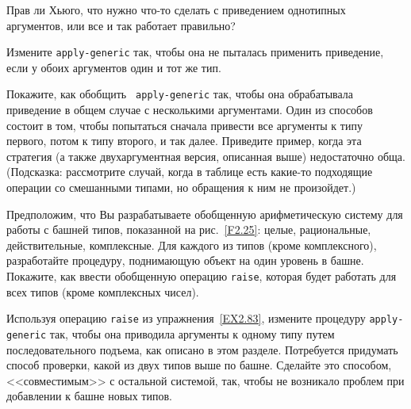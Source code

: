 \begin{exercise}{2.81}
\begin{plainenum}
\item
 Прав ли Хьюго, что нужно что-то сделать с
приведением однотипных аргументов, или все и так работает правильно?

\item
 Измените {\tt apply-generic} так,
чтобы она не пыталась применить приведение, если у обоих аргументов
один и тот же тип.
\end{plainenum}
\end{exercise}

\begin{exercise}{2.82}\label{EX2.82}%
Покажите, как обобщить {\tt
  apply-generic} так, 
чтобы она обрабатывала приведение в общем случае с несколькими
аргументами.  Один из способов состоит в том, чтобы попытаться сначала
привести все аргументы к типу первого, потом к типу второго, и так
далее.  Приведите пример, когда эта стратегия (а также двухаргументная
версия, описанная выше) недостаточно обща.  (Подсказка: рассмотрите
случай, когда в таблице есть какие-то подходящие операции со
смешанными типами, но обращения к ним не произойдет.)
\end{exercise}

\begin{exercise}{2.83}\label{EX2.83}%
Предположим, что Вы разрабатываете обобщенную
арифметическую систему для работы с башней типов, показанной на
рис.~\ref{F2.25}: целые, рациональные, действительные,
комплексные.   Для каждого из типов (кроме комплексного), разработайте
процедуру, поднимающую объект на один уровень в башне.  Покажите, как
ввести обобщенную операцию {\tt raise}, которая будет
работать для всех типов (кроме комплексных чисел).
\end{exercise}

\begin{exercise}{2.84}\label{EX2.84}%
Используя операцию {\tt raise} из
упражнения~\ref{EX2.83}, измените процедуру
{\tt apply-generic} так, чтобы она приводила аргументы к одному
типу путем последовательного подъема, как описано в этом разделе.
Потребуется придумать способ проверки, какой из двух типов выше по
башне.  Сделайте это способом, <<совместимым>> с остальной системой,
так, чтобы не возникало проблем при добавлении к башне новых типов.
\end{exercise}

